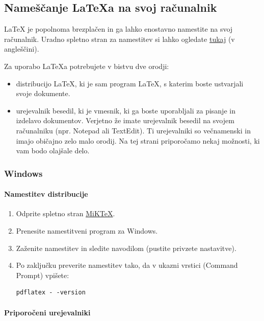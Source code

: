 \subsection{Nameščanje LaTeXa na svoj računalnik}

LaTeX je popolnoma brezplačen in ga lahko enostavno namestite na svoj računalnik.
Uradno spletno stran za namestitev si lahko ogledate \href{https://www.latex-project.org/get/}{tukaj} (v angleščini).

Za uporabo LaTeXa potrebujete v bistvu dve orodji:

\begin{itemize}
\item distribucijo LaTeX, ki je sam program LaTeX, s katerim boste ustvarjali svoje dokumente.
\item urejevalnik besedil, ki je vmesnik, ki ga boste uporabljali za pisanje in izdelavo dokumentov. Verjetno že imate urejevalnik besedil na svojem računalniku (npr. Notepad ali TextEdit). Ti urejevalniki so večnamenski in imajo običajno zelo malo orodij. Na tej strani priporočamo nekaj možnosti, ki vam bodo olajšale delo.
\end{itemize}

\subsubsection{Windows}

\paragraph{Namestitev distribucije}

\begin{enumerate}
\item Odprite spletno stran \href{https://miktex.org/download}{MiKTeX}.
\item Prenesite namestitveni program za Windows.
\item Zaženite namestitev in sledite navodilom (pustite privzete nastavitve).
\item Po zaključku preverite namestitev tako, da v ukazni vrstici (Command Prompt) vpišete:

\begin{verbatim}
pdflatex - -version
\end{verbatim}
\end{enumerate}

\paragraph{Priporočeni urejevalniki}

